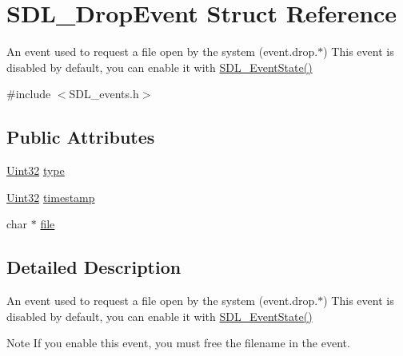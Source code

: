 \hypertarget{struct_s_d_l___drop_event}{\section{S\-D\-L\-\_\-\-Drop\-Event Struct Reference}
\label{struct_s_d_l___drop_event}
}


An event used to request a file open by the system (event.\-drop.$\ast$) This event is disabled by default, you can enable it with \hyperlink{_s_d_l__events_8h_afb772893e1c46f186fa39a4defe76df3}{S\-D\-L\-\_\-\-Event\-State()}  




{\ttfamily \#include $<$S\-D\-L\-\_\-events.\-h$>$}

\subsection*{Public Attributes}
\begin{DoxyCompactItemize}
\item 
\hyperlink{_s_d_l__stdinc_8h_add440eff171ea5f55cb00c4a9ab8672d}{Uint32} \hyperlink{struct_s_d_l___drop_event_a5ea27cfaa5f8d4940e9a69b68b3cc035}{type}
\item 
\hyperlink{_s_d_l__stdinc_8h_add440eff171ea5f55cb00c4a9ab8672d}{Uint32} \hyperlink{struct_s_d_l___drop_event_a02d2c81bb22db632a40cd0021ff751ab}{timestamp}
\item 
char $\ast$ \hyperlink{struct_s_d_l___drop_event_abc41ef4beb62e1d8b56827128b29585f}{file}
\end{DoxyCompactItemize}


\subsection{Detailed Description}
An event used to request a file open by the system (event.\-drop.$\ast$) This event is disabled by default, you can enable it with \hyperlink{_s_d_l__events_8h_afb772893e1c46f186fa39a4defe76df3}{S\-D\-L\-\_\-\-Event\-State()} 

\begin{DoxyNote}{Note}
If you enable this event, you must free the filename in the event. 
\end{DoxyNote}


